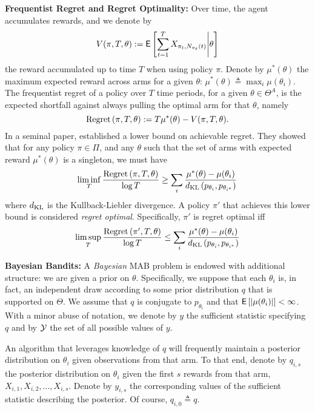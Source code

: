 \noindent\textbf{\textsf{Frequentist Regret and Regret Optimality:}} Over time, the agent accumulates rewards, and we denote by 
\[
V(\pi, T, \theta) := 
\mathsf{E} \left[
	\sum_{t=1}^T
	X_{
		\pi_t,
		N_{\pi_t}(t)
	}
\Bigg |
\theta
\right]
\] 
the reward accumulated up to time $T$ when using policy $\pi$. Denote by $\mu^*(\theta)$ the maximum expected reward across arms for a given $\theta$:  $\mu^*(\theta) \triangleq \max_i \mu(\theta_i)$. The frequentist regret of a policy over $T$ time periods, for a given $\theta \in \Theta^A$, is the expected shortfall against always pulling the optimal arm for that $\theta$, namely
\[
\textnormal{Regret} \left( \pi, T, \theta \right) := 
T \mu^*(\theta) -
V(\pi, T, \theta).
\]
In a seminal paper, \cite{lai1985asymptotically} established a lower bound on achievable regret. They showed that for any policy $\pi \in \Pi$, and any $\theta$ such that the set of arms with expected reward $\mu^*(\theta)$ is a singleton, we must have
\begin{equation}
\label{eq:lai_robbins_lb}
\liminf_T
\frac{
	\textnormal{Regret} \left( \pi, T, \theta \right)
}
{
	\log T
}
\geq
\sum_{i}
\frac{\mu^*(\theta) - \mu(\theta_i)}{d_{\rm KL}\left(p_{\theta_i},p_{\theta_{i^*}} \right)}
\end{equation}
where $d_{\rm KL}$ is the Kullback-Liebler divergence. A policy $\pi'$ that achieves this lower bound is considered {\em regret optimal}. Specifically, $\pi'$ is regret optimal iff 
\[
\limsup_T
\frac{
	\textnormal{Regret} \left( \pi', T, \theta \right)
}
{
	\log T
}
\leq
\sum_{i}
\frac{\mu^*(\theta) - \mu(\theta_i)}{d_{\rm KL}\left(p_{\theta_i},p_{\theta_{i^*}} \right)}
\]

\noindent\textbf{\textsf{Bayesian Bandits: }}A {\em Bayesian} MAB problem is endowed with additional structure: we are given a prior on $\theta$. Specifically, we suppose that each $\theta_i$ is, in fact, an independent draw according to some prior distribution $q$ that is supported on $\Theta$. We assume that $q$ is conjugate to $p_{\theta_i}$ and that $\mathsf{E} \left[ |\mu(\theta_i)| \right] < \infty$. With a minor abuse of notation, we denote by $y$ the sufficient statistic specifying $q$ and by $\mathcal Y$ the set of all possible values of $y$. 

An algorithm that leverages knowledge of $q$ will frequently maintain a posterior distribution on $\theta_i$ given observations from that arm. To that end, denote by $q_{i,s}$ the posterior distribution on $\theta_i$ given the first $s$ rewards from that arm, $X_{i,1},X_{i,2},\dots,X_{i,s}$. Denote by $y_{i,s}$ the corresponding values of the sufficient statistic describing the posterior. Of course, $q_{i,0} \triangleq q$. 

